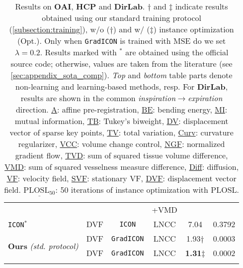 \begin{table}[htp]
\begin{small}
{\begin{tabular}{lccccc}
				                                                          &                      &                                       & +VMD    &                             &                         \\
				\texttt{ICON}$^\ast$~\cite{greer2021icon}                 & DVF                  & \texttt{ICON}                         & LNCC    & 7.04\resTS                  & 0.3792                  \\
				\multirow{2}{*}{\textbf{Ours} \emph{(std. protocol)}}     & DVF                  & \cellcolor{black!10}\texttt{GradICON} & LNCC    & 1.93$\dagger$               & 0.0003                 \\
				                                                          & DVF                  & \cellcolor{black!10}\texttt{GradICON} & LNCC    & \textbf{1.31}$\ddagger$     & 0.0002                  \\
				\bottomrule\vspace{-7mm}
			\end{tabular}}
		\caption{Results on \textbf{OAI}, \textbf{HCP} and \textbf{DirLab}. $\dagger$ and $\ddagger$ indicate results obtained using our standard training protocol (\ref{subsection:training}), w/o ($\dagger$) and w/ ($\ddagger$) instance optimization (Opt.). Only when \texttt{GradICON} is trained with MSE do we set $\lambda=0.2$. Results marked with $^\ast$ are obtained using the official source code; otherwise, values are taken from the literature (see \ref{sec:appendix_sota_comp}). \emph{Top} and \emph{bottom} table parts denote non-learning and learning-based methods, resp. For \textbf{DirLab}, results are shown in the common \emph{inspiration$\rightarrow$expiration} direction.  \underline{A}: affine pre-registration, \underline{BE}: bending energy, \underline{MI}: mutual information, \underline{TB}: Tukey's biweight, \underline{DV}: displacement vector of sparse key points, \underline{TV}: total variation, \underline{Curv}: curvature regularizer, \underline{VCC}: volume change control, \underline{NGF}: normalized gradient flow, \underline{TVD}: sum of squared tissue volume difference, \underline{VMD}: sum of squared vesselness measure difference, \underline{Diff}: diffusion, \underline{VF}: velocity field, \underline{SVF}: stationary VF, \underline{DVF}: displacement vector field. $\underline{\text{PLOSL}_{50}}$: 50 iterations of instance optimization with PLOSL.
		}
		\label{tab:exp_oai}
	\end{small}
\end{table}
\addtolength{\tabcolsep}{4.5pt}

